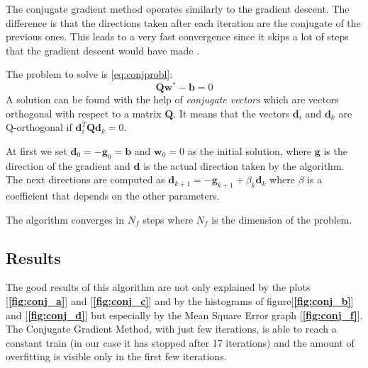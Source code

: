 \documentclass[12pt]{report}
\renewcommand{\vec}{\mathbf}
\renewcommand{\vec}{\mathbf}
\begin{document}
The conjugate gradient method operates similarly to the gradient descent. The difference is that the directions taken after each iteration are the conjugate of the previous ones. This leads to a very fast convergence since it skips a lot of steps that the gradient descent would have made \cite{conjjj}.

The problem to solve is \eqref{eq:conjprobl}:
\begin{equation}
\label{eq:conjprobl}
\vec{Q}\vec{w}^*-\vec{b}=0
\end{equation}
A solution can be found with the help of \emph{conjugate vectors} which are vectors orthogonal with respect to a matrix $\vec{Q}$. It means that the vectors $\vec{d}_i$ and $\vec{d}_k$ are Q-orthogonal if $\vec{d}_i^T\vec{Q}\vec{d}_k=0$.


At first we set $\vec{d}_0=-\vec{g}_0=\vec{b}$ and $\vec{w}_0=0$ as the initial solution, where $\vec{g}$ is the direction of the gradient and $\vec{d}$ is the actual direction taken by the algorithm.
The next directions are computed as $\vec{d}_{k+1}=-\vec{g}_{k+1}+\beta_{k}\vec{d}_k$ where $\beta$ is a coefficient that depends on the other parameters.

The algorithm converges in $N_{f}$ steps where $N_{f}$ is the dimension of the problem.


\subsection{Results}
The good results of this algorithm are not only explained by the plots [\textbf{\ref{fig:conj_a}}] and [\textbf{\ref{fig:conj_c}}] and by the histograms of figure[\textbf{\ref{fig:conj_b}}] and [\textbf{\ref{fig:conj_d}}] but especially by the Mean Square Error graph [\textbf{\ref{fig:conj_f}}]. The Conjugate Gradient Method, with just few iterations, is able to reach a constant train (in our case it has stopped after 17 iterations) and the amount of overfitting is visible only in the first few iterations.

\pagebreak
\end{document}
